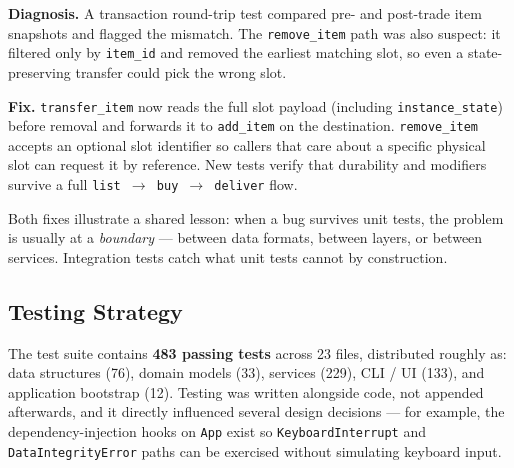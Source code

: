 \documentclass[11pt,a4paper]{article}
\begin{document}
\begin{itemize}
\textbf{Diagnosis.} A transaction round-trip test compared pre- and post-trade item snapshots and flagged the mismatch. The \texttt{remove\_item} path was also suspect: it filtered only by \texttt{item\_id} and removed the earliest matching slot, so even a state-preserving transfer could pick the wrong slot.

\textbf{Fix.} \texttt{transfer\_item} now reads the full slot payload (including \texttt{instance\_state}) before removal and forwards it to \texttt{add\_item} on the destination. \texttt{remove\_item} accepts an optional slot identifier so callers that care about a specific physical slot can request it by reference. New tests verify that durability and modifiers survive a full \texttt{list \(\rightarrow\) buy \(\rightarrow\) deliver} flow.

\end{itemize}

Both fixes illustrate a shared lesson: when a bug survives unit tests, the problem is usually at a \emph{boundary} — between data formats, between layers, or between services. Integration tests catch what unit tests cannot by construction.

\subsection{Testing Strategy}

The test suite contains \textbf{483 passing tests} across 23 files, distributed roughly as: data structures (76), domain models (33), services (229), CLI / UI (133), and application bootstrap (12). Testing was written alongside code, not appended afterwards, and it directly influenced several design decisions — for example, the dependency-injection hooks on \texttt{App} exist so \texttt{KeyboardInterrupt} and \texttt{DataIntegrityError} paths can be exercised without simulating keyboard input.
\end{document}
